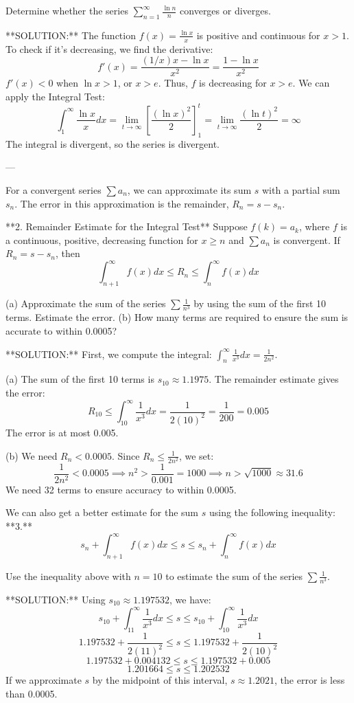 \documentclass[10pt]{book}
\begin{document}
Determine whether the series $\sum_{n=1}^{\infty} \frac{\ln n}{n}$ converges or diverges.

**SOLUTION:**
The function $f(x) = \frac{\ln x}{x}$ is positive and continuous for $x > 1$. To check if it's decreasing, we find the derivative:
$$
f'(x) = \frac{(1/x)x - \ln x}{x^2} = \frac{1 - \ln x}{x^2}
$$
$f'(x) < 0$ when $\ln x > 1$, or $x > e$. Thus, $f$ is decreasing for $x > e$. We can apply the Integral Test:
$$
\int_1^\infty \frac{\ln x}{x} dx = \lim_{t \to \infty} \left[ \frac{(\ln x)^2}{2} \right]_1^t = \lim_{t \to \infty} \frac{(\ln t)^2}{2} = \infty
$$
The integral is divergent, so the series is divergent.

---


For a convergent series $\sum a_n$, we can approximate its sum $s$ with a partial sum $s_n$. The error in this approximation is the remainder, $R_n = s - s_n$.

**2. Remainder Estimate for the Integral Test**
Suppose $f(k) = a_k$, where $f$ is a continuous, positive, decreasing function for $x \ge n$ and $\sum a_n$ is convergent. If $R_n = s - s_n$, then
$$
\int_{n+1}^\infty f(x) dx \le R_n \le \int_n^\infty f(x) dx
$$


(a) Approximate the sum of the series $\sum \frac{1}{n^3}$ by using the sum of the first 10 terms. Estimate the error.
(b) How many terms are required to ensure the sum is accurate to within 0.0005?

**SOLUTION:**
First, we compute the integral: $\int_n^\infty \frac{1}{x^3} dx = \frac{1}{2n^2}$.

(a) The sum of the first 10 terms is $s_{10} \approx 1.1975$. The remainder estimate gives the error:
$$
R_{10} \le \int_{10}^\infty \frac{1}{x^3} dx = \frac{1}{2(10)^2} = \frac{1}{200} = 0.005
$$
The error is at most 0.005.

(b) We need $R_n < 0.0005$. Since $R_n \le \frac{1}{2n^2}$, we set:
$$
\frac{1}{2n^2} < 0.0005 \implies n^2 > \frac{1}{0.001} = 1000 \implies n > \sqrt{1000} \approx 31.6
$$
We need 32 terms to ensure accuracy to within 0.0005.

We can also get a better estimate for the sum $s$ using the following inequality:
**3.** $$
s_n + \int_{n+1}^\infty f(x) dx \le s \le s_n + \int_n^\infty f(x) dx
$$


Use the inequality above with $n=10$ to estimate the sum of the series $\sum \frac{1}{n^3}$.

**SOLUTION:**
Using $s_{10} \approx 1.197532$, we have:
$$
s_{10} + \int_{11}^\infty \frac{1}{x^3} dx \le s \le s_{10} + \int_{10}^\infty \frac{1}{x^3} dx
$$
$$
1.197532 + \frac{1}{2(11)^2} \le s \le 1.197532 + \frac{1}{2(10)^2}
$$
$$
1.197532 + 0.004132 \le s \le 1.197532 + 0.005
$$
$$
1.201664 \le s \le 1.202532
$$
If we approximate $s$ by the midpoint of this interval, $s \approx 1.2021$, the error is less than 0.0005.
\end{document}
